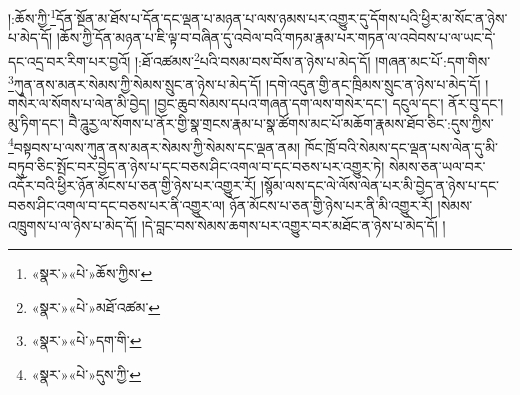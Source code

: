 །:ཆོས་ཀྱི་\footnote{«སྣར་»«པེ་»ཆོས་ཀྱིས་}དོན་སྔོན་མ་ཐོས་པ་དོན་དང་ལྡན་པ་མཉན་པ་ལས་ཉམས་པར་འགྱུར་དུ་དོགས་པའི་ཕྱིར་མ་སོང་ན་ཉེས་པ་མེད་དོ། །ཆོས་ཀྱི་དོན་མཉན་པ་ཇི་ལྟ་བ་བཞིན་དུ་འབེལ་བའི་གཏམ་རྣམ་པར་གཏན་ལ་འབེབས་པ་ལ་ཡང་དེ་དང་འདྲ་བར་རིག་པར་བྱའོ། །:ཐོ་འཚམས་\footnote{«སྣར་»«པེ་»མཐོ་འཚམ་}པའི་བསམ་བས་བོས་ན་ཉེས་པ་མེད་དོ། །གཞན་མང་པོ་:དག་གིས་\footnote{«སྣར་»«པེ་»དག་གི་}ཀུན་ནས་མནར་སེམས་ཀྱི་སེམས་སྲུང་ན་ཉེས་པ་མེད་དོ། །དགེ་འདུན་གྱི་ནང་ཁྲིམས་སྲུང་ན་ཉེས་པ་མེད་དོ། །གསེར་ལ་སོགས་པ་ལེན་མི་བྱེད། །བྱང་ཆུབ་སེམས་དཔའ་གཞན་དག་ལས་གསེར་དང་། དངུལ་དང་། ནོར་བུ་དང་། མུ་ཏིག་དང་། བཻ་ཌཱུརྱ་ལ་སོགས་པ་ནོར་གྱི་སྣ་གྲངས་རྣམ་པ་སྣ་ཚོགས་མང་པོ་མཆོག་རྣམས་ཐོབ་ཅིང་:དུས་ཀྱིས་\footnote{«སྣར་»«པེ་»དུས་ཀྱི་}བསྟབས་པ་ལས་ཀུན་ནས་མནར་སེམས་ཀྱི་སེམས་དང་ལྡན་ནམ། ཁོང་ཁྲོ་བའི་སེམས་དང་ལྡན་པས་ལེན་དུ་མི་བཏུབ་ཅིང་སྤོང་བར་བྱེད་ན་ཉེས་པ་དང་བཅས་ཤིང་འགལ་བ་དང་བཅས་པར་འགྱུར་ཏེ། སེམས་ཅན་ཡལ་བར་འདོར་བའི་ཕྱིར་ཉོན་མོངས་པ་ཅན་གྱི་ཉེས་པར་འགྱུར་རོ། །སྙོམ་ལས་དང་ལེ་ལོས་ལེན་པར་མི་བྱེད་ན་ཉེས་པ་དང་བཅས་ཤིང་འགལ་བ་དང་བཅས་པར་ནི་འགྱུར་ལ། ཉོན་མོངས་པ་ཅན་གྱི་ཉེས་པར་ནི་མི་འགྱུར་རོ། །སེམས་འཁྲུགས་པ་ལ་ཉེས་པ་མེད་དོ། །དེ་བླང་བས་སེམས་ཆགས་པར་འགྱུར་བར་མཐོང་ན་ཉེས་པ་མེད་དོ། །
